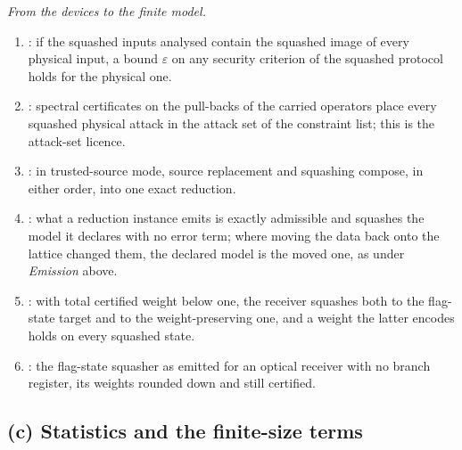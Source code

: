 \noindent\emph{From the devices to the finite model.}
\begin{enumerate}[resume,itemsep=1pt]
\item {}: if the squashed inputs analysed contain
  the squashed image of every physical input, a bound $\varepsilon$ on any
  security criterion of the squashed protocol holds for the physical one.
\item {}: spectral certificates on the pull-backs
  of the carried operators place every squashed physical attack in the attack
  set of the constraint list; this is the attack-set licence.
\item {}: in trusted-source mode, source
  replacement and squashing compose, in either order, into one exact
  reduction.
\item {}: what a reduction instance emits is exactly
  admissible and squashes the model it declares with no error term; where
  moving the data back onto the lattice changed them, the declared model is
  the moved one, as under \emph{Emission} above.
\item {}: with total certified weight below
  one, the receiver squashes both to the flag-state target and to the
  weight-preserving one, and a weight the latter encodes holds on every
  squashed state.
\item {}: the flag-state squasher as
  emitted for an optical receiver with no branch register, its weights
  rounded down and still
  certified.
\end{enumerate}

\subsection*{(c) Statistics and the finite-size terms}

